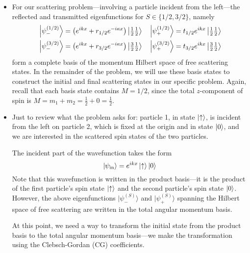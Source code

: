 \documentclass[11pt, a4paper]{article}
\newcommand{\ua}{\uparrow}  %
\newcommand{\bket}[1]{\big | {#1} \big \rangle}  %
\begin{document}
\begin{itemize}
	\item For our scattering problem---involving a particle incident from the left---the reflected and transmitted eigenfunctions for $ S \in \{1/2, 3/2\} $, namely
	\begin{align*}
		&\ket{\psi^{(1/2)}_{-}} = \left(e^{ik x} + r_{1/2}e^{-i\kappa x}\right)\ket{\tfrac{1}{2}\tfrac{1}{2}} \quad \ket{\psi^{(1/2)}_{+}} = t_{1/2} e^{ikx}\ket{\tfrac{1}{2}\tfrac{1}{2}}\\
		&\ket{\psi^{(3/2)}_{-}} = \left(e^{ik x} + r_{3/2}e^{-i\kappa x}\right)\ket{\tfrac{3}{2}\tfrac{1}{2}} \quad \ket{\psi^{(3/2)}_{+}} = t_{3/2} e^{ikx}\ket{\tfrac{3}{2}\tfrac{1}{2}}
	\end{align*}
	form a complete basis of the momentum Hilbert space of free scattering states. In the remainder of the problem, we will use these basis states to construct the initial and final scattering states in our specific problem. Again, recall that each basis state contains $ M = 1/2 $, since the total $ z $-component of spin is $ M = m_{1} + m_{2} = \frac{1}{2} + 0  = \frac{1}{2}$.
	
	\item Just to review what the problem asks for: particle 1, in state $ \ket{\ua} $, is incident from the left on particle 2, which is fixed at the origin and in state $ \ket{0} $, and we are interested in the scattered spin states of the two particles.
	
	The incident part of the wavefunction takes the form
	\begin{equation*}
		\ket{\psi_{\text{in}}} = e^{ikx} \ket{\ua} \ket{0}
	\end{equation*}
	Note that this wavefunction is written in the product basis---it is the product of the first particle's spin state $ \ket{\ua} $ and the second particle's spin state $ \ket{0} $. However, the above eigenfunctions $ \bket{\psi^{(S)}_{-}} $ and $ \bket{\psi^{(S)}_{+}} $ spanning the Hilbert space of free scattering are written in the total angular momentum basis.
	
	At this point, we need a way to transform the initial state from the product basis to the total angular momentum basis---we make the transformation using the Clebsch-Gordan (CG) coefficients.
\end{itemize}	
\end{document}
